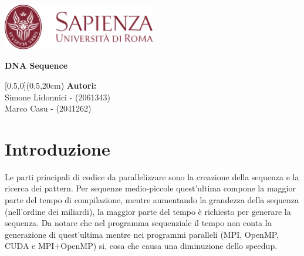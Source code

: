 \documentclass[12pt,openany]{report}
\date{\today}
\makeatletter
\def\tit{DNA Sequence}
\let\datename\@date
\def\authorname{Simone Lidonnici - (2061343)\\Marco Casu - (2041262)}
\makeatother
\begin{document}
\begin{titlepage}
    \begin{center}
        \includegraphics[width=0.5\textwidth]{images/Sapienza_logo.png}
    \end{center}
    \centering\Large \textbf{\color{Sapienza}{Facoltà di Ingegneria dell'Informazione, Informatica e Statistica\\Dipartimento di Informatica}}
    \vspace{4cm}
    \begin{tcolorbox}[enhanced, width=\textwidth, colframe=Sapienza, colback=white, halign=flush center, sharp corners=all, boxrule=1mm, bottom=5mm, top=5mm]
        \Huge\textbf{\tit}
    \end{tcolorbox}
    \begin{textblock*}{\textwidth}[0.5,0](0.5\pdfpagewidth,20cm)
        \centering\large\textbf{Autori:}\\\authorname
    \end{textblock*}
    \vfill
    \centering\large\datename
\end{titlepage}
\section{Introduzione}
Le parti principali di codice da parallelizzare sono la creazione della sequenza e la ricerca dei pattern. Per sequenze medio-piccole quest'ultima compone la maggior parte del tempo di compilazione, mentre aumentando la grandezza della sequenza (nell'ordine dei miliardi), la maggior parte del tempo è richiesto per generare la sequenza. Da notare che nel programma sequenziale il tempo non conta la generazione di quest'ultima mentre nei programmi paralleli (MPI, OpenMP, CUDA e MPI+OpenMP) si, cosa che causa una diminuzione dello speedup.

\newpage
\end{document}
